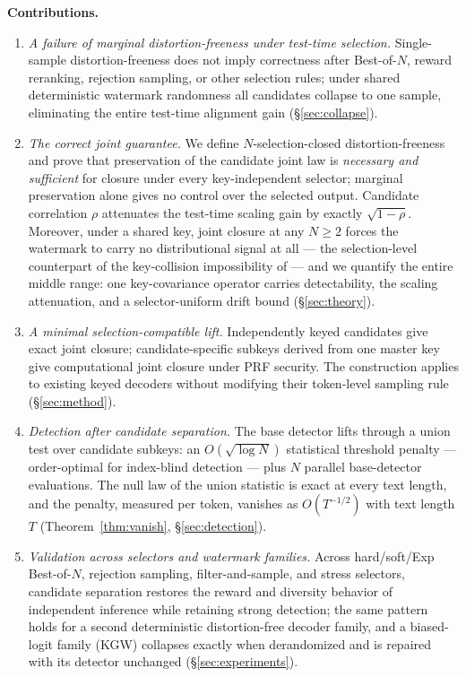\documentclass{article} %
\begin{document}
\textbf{Contributions.}
\begin{enumerate}
  \item \emph{A failure of marginal distortion-freeness under test-time
        selection.} Single-sample distortion-freeness does not imply
        correctness after Best-of-$N$, reward reranking, rejection sampling,
        or other selection rules; under shared deterministic watermark
        randomness all candidates collapse to one sample, eliminating the
        entire test-time alignment gain (\S\ref{sec:collapse}).
  \item \emph{The correct joint guarantee.} We define $N$-selection-closed
        distortion-freeness and prove that preservation of the candidate joint
        law is \emph{necessary and sufficient} for closure under every
        key-independent selector; marginal preservation alone gives no control
        over the selected output. Candidate correlation $\rho$ attenuates the
        test-time scaling gain by exactly $\sqrt{1-\rho}$. Moreover,
        under a shared key, joint closure at any $N\ge2$ forces the
        watermark to carry no distributional signal at all --- the
        selection-level counterpart of the key-collision impossibility of
        \citet{keycollision2024} --- and we quantify the entire middle
        range: one key-covariance operator carries detectability, the
        scaling attenuation, and a selector-uniform drift bound
        (\S\ref{sec:theory}).
  \item \emph{A minimal selection-compatible lift.} Independently keyed
        candidates give exact joint closure; candidate-specific subkeys
        derived from one master key give computational joint closure under PRF
        security. The construction applies to existing keyed decoders without
        modifying their token-level sampling rule (\S\ref{sec:method}).
  \item \emph{Detection after candidate separation.} The base detector lifts
        through a union test over candidate subkeys: an $O(\sqrt{\log N})$
        statistical threshold penalty --- order-optimal for index-blind
        detection --- plus $N$ parallel base-detector evaluations. The null
        law of the union statistic is exact at every text length, and the
        penalty, measured per token, vanishes as $O(T^{-1/2})$ with text
        length $T$ (Theorem~\ref{thm:vanish}, \S\ref{sec:detection}).
  \item \emph{Validation across selectors and watermark families.} Across
        hard/soft/Exp Best-of-$N$, rejection sampling, filter-and-sample, and
        stress selectors, candidate separation restores the reward and
        diversity behavior of independent inference while retaining strong
        detection; the same pattern holds for a second deterministic
        distortion-free decoder family, and a biased-logit family (KGW)
        collapses exactly when derandomized and is repaired with its
        detector unchanged (\S\ref{sec:experiments}).
\end{enumerate}
\end{document}
